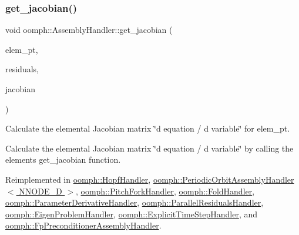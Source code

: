 \mbox{\label{classoomph_1_1AssemblyHandler_ad43c3d8760be0ba6ebee8d82509458e5}} 
\subsubsection{\texorpdfstring{get\+\_\+jacobian()}{get\_jacobian()}}
{\footnotesize\ttfamily void oomph\+::\+Assembly\+Handler\+::get\+\_\+jacobian (\begin{DoxyParamCaption}\item[{\hyperlink{classoomph_1_1GeneralisedElement}{Generalised\+Element} $\ast$const \&}]{elem\+\_\+pt,  }\item[{\hyperlink{classoomph_1_1Vector}{Vector}$<$ double $>$ \&}]{residuals,  }\item[{\hyperlink{classoomph_1_1DenseMatrix}{Dense\+Matrix}$<$ double $>$ \&}]{jacobian }\end{DoxyParamCaption})\hspace{0.3cm}{\ttfamily [virtual]}}



Calculate the elemental Jacobian matrix \char`\"{}d equation 
/ d variable\char`\"{} for elem\+\_\+pt. 

Calculate the elemental Jacobian matrix \char`\"{}d equation / d variable\char`\"{} by calling the element\textquotesingle{}s get\+\_\+jacobian function. 

Reimplemented in \hyperlink{classoomph_1_1HopfHandler_ab36c50421f53accced01dd9e04d904ef}{oomph\+::\+Hopf\+Handler}, \hyperlink{classoomph_1_1PeriodicOrbitAssemblyHandler_a6d901ecdefca1c59403a4ae4b215446f}{oomph\+::\+Periodic\+Orbit\+Assembly\+Handler$<$ N\+N\+O\+D\+E\+\_\+D $>$}, \hyperlink{classoomph_1_1PitchForkHandler_aa6728813a099111bee2b6c79dec20fc4}{oomph\+::\+Pitch\+Fork\+Handler}, \hyperlink{classoomph_1_1FoldHandler_ad1bec54a2e0c5bd483ff0bf633bd6542}{oomph\+::\+Fold\+Handler}, \hyperlink{classoomph_1_1ParameterDerivativeHandler_a0bdfd879c1e63cc74923cf956b4f4310}{oomph\+::\+Parameter\+Derivative\+Handler}, \hyperlink{classoomph_1_1ParallelResidualsHandler_a366186bb0905d7251390ec726fe33797}{oomph\+::\+Parallel\+Residuals\+Handler}, \hyperlink{classoomph_1_1EigenProblemHandler_aaaf7c3aa3713030ff4859117941b3a39}{oomph\+::\+Eigen\+Problem\+Handler}, \hyperlink{classoomph_1_1ExplicitTimeStepHandler_ad2c849833e4b35199a79d9d9965af32f}{oomph\+::\+Explicit\+Time\+Step\+Handler}, and \hyperlink{classoomph_1_1FpPreconditionerAssemblyHandler_a6360dd27d3530576487cb7e239dfe17e}{oomph\+::\+Fp\+Preconditioner\+Assembly\+Handler}.



